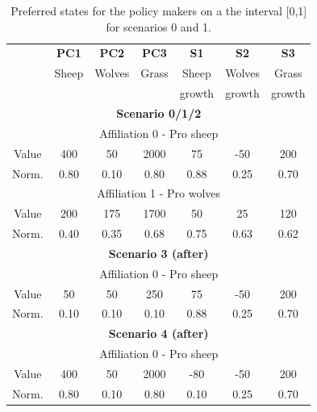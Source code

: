 \documentclass[12pt]{article}
\begin{document}

\begin{table}[h!]
\begin{center}
\begin{tabular}{ |c|c|c|c|c|c|c| } 
\hline

			& {\bfseries PC1}
					&  {\bfseries PC2}
							&  {\bfseries PC3}
									&  {\bfseries S1}	
											&  {\bfseries S2}	
													&  {\bfseries S3}  	\\ 
			& Sheep	& Wolves	& Grass	& Sheep	& Wolves	& Grass 	\\
			&		&		&		& growth	& growth	& growth	\\ \hline \hline \hline
\multicolumn{7}{|c|}{ {\bfseries Scenario 0/1/2}}							\\ \hline \hline	
\multicolumn{7}{|c|}{Affiliation 0 - Pro sheep}							\\ \hline 
Value		& 400	& 50		& 2000	& 75		& -50	& 200	\\ \hline
Norm.		& 0.80	& 0.10	& 0.80	& 0.88	& 0.25	& 0.70	\\ \hline
\multicolumn{7}{|c|}{Affiliation 1 - Pro wolves}							\\ \hline 
Value		& 200	& 175	& 1700	& 50		& 25		& 120	\\ \hline
Norm.		& 0.40	& 0.35	& 0.68	& 0.75	& 0.63	& 0.62	\\ \hline
\multicolumn{7}{|c|}{ {\bfseries Scenario 3 (after)}}						\\ \hline \hline	
\multicolumn{7}{|c|}{Affiliation 0 - Pro sheep}							\\ \hline 
Value		& 50	 	& 50		& 250	& 75		& -50	& 200	\\ \hline
Norm.		& 0.10	& 0.10	& 0.10	& 0.88	& 0.25	& 0.70	\\ \hline
\multicolumn{7}{|c|}{ {\bfseries Scenario 4 (after)}}						\\ \hline \hline	
\multicolumn{7}{|c|}{Affiliation 0 - Pro sheep}							\\ \hline 
Value		& 400	& 50		& 2000	& -80	& -50	& 200	\\ \hline
Norm.		& 0.80	& 0.10	& 0.80	& 0.10	& 0.25	& 0.70	\\ \hline

\end{tabular}
\end{center}
\caption{Preferred states for the policy makers on a the interval [0,1] for scenarios 0 and 1.}
\label{tab:preferredStates}
\end{table}
\end{document}
